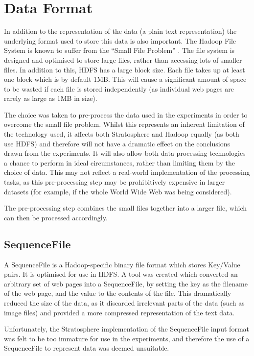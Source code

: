 \section{Data Format}
In addition to the representation of the data (a plain text representation) the underlying format used to store this data is also important. The Hadoop File System is known to suffer from the ``Small File Problem'' \cite{hdfsSmallFiles}. The file system is designed and optimised to store large files, rather than accessing lots of smaller files. In addition to this, HDFS has a large block size. Each file takes up at least one block which is by default 1MB. This will cause a significant amount of space to be wasted if each file is stored independently (as individual web pages are rarely as large as 1MB in size).

The choice was taken to pre-process the data used in the experiments in order to overcome the small file problem. Whilst this represents an inherent limitation of the technology used, it affects both Stratosphere and Hadoop equally (as both use HDFS) and therefore will not have a dramatic effect on the conclusions drawn from the experiments. It will also allow both data processing technologies a chance to perform in ideal circumstances, rather than limiting them by the choice of data. This may not reflect a real-world implementation of the processing tasks, as this pre-processing step may be prohibitively expensive in larger datasets (for example, if the whole World Wide Web was being considered).

The pre-processing step combines the small files together into a larger file, which can then be processed accordingly.

\subsection{SequenceFile}
A SequenceFile is a Hadoop-specific binary file format which stores Key/Value pairs. It is optimised for use in HDFS. A tool was created which converted an arbitrary set of web pages into a SequenceFile, by setting the key as the filename of the web page, and the value to the contents of the file. This dramatically reduced the size of the data, as it discarded irrelevant parts of the data (such as image files) and provided a more compressed representation of the text data. 

Unfortunately, the Stratosphere implementation of the SequenceFile input format was felt to be too immature for use in the experiments, and therefore the use of a SequenceFile to represent data was deemed unsuitable.

